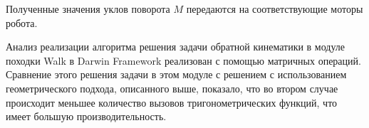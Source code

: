 Полученные значения уклов поворота $M$ передаются на соответствующие моторы робота.

Анализ реализации алгоритма решения задачи обратной кинематики в модуле походки Walk в Darwin Framework реализован с помощью матричных операций. Сравнение этого решения задачи в этом модуле с решением с использованием геометрического подхода, описанного выше, показало, что во втором случае происходит меньшее количество вызовов тригонометрических функций, что имеет большую производительность.







